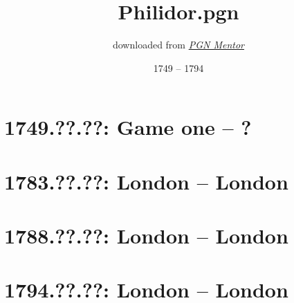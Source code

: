 \documentclass[11pt]{article}
\title{Philidor.pgn}
\date{1749 -- 1794}
\author{downloaded from \href{https://www.pgnmentor.com/files.html}{\emph{PGN Mentor}}}
\begin{document}
\maketitle


\tableofcontents
\pagebreak[4]

\section{1749.??.??: Game one -- ?}

\pagebreak[4]

\section{1783.??.??: London -- London}

\pagebreak[4]

\section{1788.??.??: London -- London}

\pagebreak[4]

\section{1794.??.??: London -- London}

\pagebreak[4]


\pagebreak[4]


\pagebreak[4]
\end{document}
